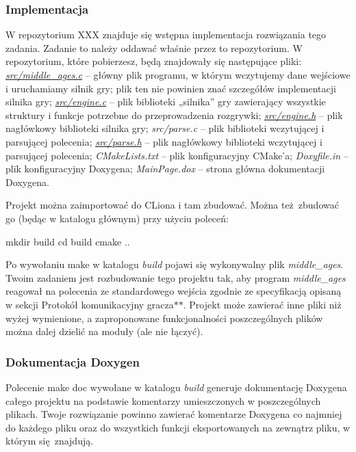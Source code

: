 \subsubsection*{Implementacja}

W repozytorium X\-X\-X znajduje się wstępna implementacja rozwiązania tego zadania. Zadanie to należy oddawać właśnie przez to repozytorium. W repozytorium, które pobierzesz, będą znajdowały się następujące pliki\-: {\itshape \hyperlink{middle__ages_8c}{src/middle\-\_\-ages.\-c}} – główny plik programu, w którym wczytujemy dane wejściowe i uruchamiamy silnik gry; plik ten nie powinien znać szczegółów implementacji silnika gry; {\itshape \hyperlink{engine_8c}{src/engine.\-c}} – plik biblioteki „silnika” gry zawierający wszystkie struktury i funkcje potrzebne do przeprowadzenia rozgrywki; {\itshape \hyperlink{engine_8h}{src/engine.\-h}} – plik nagłówkowy biblioteki silnika gry; {\itshape src/parse.\-c} – plik biblioteki wczytującej i parsującej polecenia; {\itshape \hyperlink{parse_8h}{src/parse.\-h}} – plik nagłówkowy biblioteki wczytującej i parsującej polecenia; {\itshape C\-Make\-Lists.\-txt} – plik konfiguracyjny C\-Make'a; {\itshape Doxyfile.\-in} – plik konfiguracyjny Doxygena; {\itshape Main\-Page.\-dox} – strona główna dokumentacji Doxygena.

Projekt można zaimportować do C\-Liona i tam zbudować. Można też zbudować go (będąc w katalogu głównym) przy użyciu poleceń\-: \begin{DoxyVerb}mkdir build
cd build
cmake ..
\end{DoxyVerb}


Po wywołaniu {\ttfamily make} w katalogu {\itshape build} pojawi się wykonywalny plik {\itshape middle\-\_\-ages}. Twoim zadaniem jest rozbudowanie tego projektu tak, aby program {\itshape middle\-\_\-ages} reagował na polecenia ze standardowego wejścia zgodnie ze specyfikacją opisaną w sekcji Protokół komunikacyjny gracza$\ast$$\ast$. Projekt może zawierać inne pliki niż wyżej wymienione, a zaproponowane funkcjonalności poszczególnych plików można dalej dzielić na moduły (ale nie łączyć).

\subsubsection*{Dokumentacja Doxygen}

Polecenie {\ttfamily make doc} wywołane w katalogu {\itshape build} generuje dokumentację Doxygena całego projektu na podstawie komentarzy umieszczonych w poszczególnych plikach. Twoje rozwiązanie powinno zawierać komentarze Doxygena co najmniej do każdego pliku oraz do wszystkich funkcji eksportowanych na zewnątrz pliku, w którym się znajdują.

